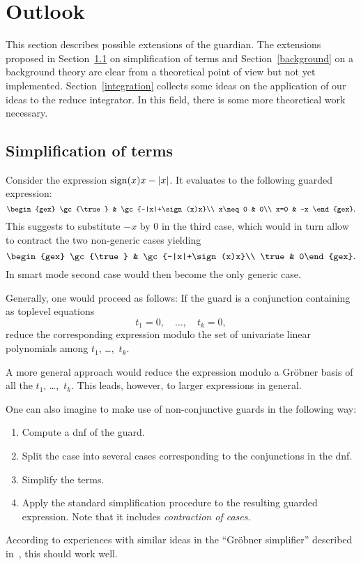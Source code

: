 \section{Outlook}
This section describes possible extensions of the {\sc guardian}. The
extensions proposed in Section~\ref{simplification} on simplification
of terms and Section~\ref{background} on a background theory are clear
from a theoretical point of view but not yet implemented.
Section~\ref{integration} collects some ideas on the application of
our ideas to the {\sc reduce} integrator. In this field, there is some
more theoretical work necessary.
%
\subsection{Simplification of terms}\label{simplification}
Consider the expression $\sign(x)x-|x|$. It evaluates to the following
guarded expression:
$$
\begin{gex}
\gc{\true} & \gc{-|x|+\sign(x)x}\\
x\neq 0 & 0\\
x=0 & -x
\end{gex}.
$$
This suggests to substitute $-x$ by $0$ in the third case, which would
in turn allow to contract the two non-generic cases yielding
$$
\begin{gex}
\gc{\true} & \gc{-|x|+\sign(x)x}\\
\true & 0\end{gex}.
$$
In smart mode second case would then become the only generic case.

Generally, one would proceed as follows: If the guard is a conjunction
containing as toplevel equations
$$
t_1=0,\quad \dots,\quad t_k=0,
$$
reduce the corresponding expression modulo the set of univariate
linear polynomials among $t_1$, \dots,~$t_k$.

A more general approach would reduce the expression modulo a Gr\"obner
basis of all the $t_1$, \dots,~$t_k$. This leads, however, to larger
expressions in general.

One can also imagine to make use of non-conjunctive guards in the
following way:
\begin{enumerate}
\item Compute a {\sc dnf} of the guard.
\item Split the case into several cases corresponding to the
conjunctions in the {\sc dnf}.
\item Simplify the terms.
\item Apply the standard simplification procedure to the resulting
guarded expression. Note that it includes {\em contraction of cases}.
\end{enumerate}
According to experiences with similar ideas in the ``Gr\"obner
simplifier'' described in~\cite{DolzmannSturm:95}, this should work
well.
%
